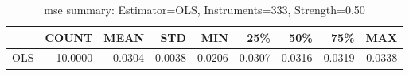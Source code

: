 \begin{table}[ht]
\centering
\caption{mse summary: Estimator=OLS, Instruments=333, Strength=0.50}
\begin{tabular}{lrrrrrrrr}
\toprule
 & COUNT & MEAN & STD & MIN & 25\% & 50\% & 75\% & MAX \\
\midrule
OLS & 10.0000 & 0.0304 & 0.0038 & 0.0206 & 0.0307 & 0.0316 & 0.0319 & 0.0338 \\
\bottomrule
\end{tabular}
\end{table}
